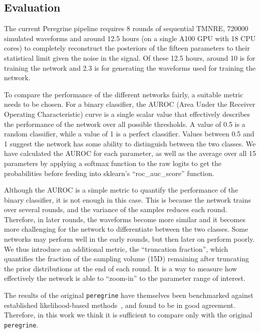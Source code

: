 \subsection{Evaluation}

The current Peregrine pipeline requires 8 rounds of sequential TMNRE, 720000 simulated waveforms and around 12.5 hours (on a single A100 GPU with 18 CPU cores) to completely reconstruct the posteriors of the fifteen parameters to their statistical limit given the noise in the signal. Of these 12.5 hours, around 10 is for training the network and 2.3 is for generating the waveforms used for training the network. 

To compare the performance of the different networks fairly, a suitable metric needs to be chosen. For a binary classifier, the AUROC (Area Under the Receiver Operating Characteristic) curve is a single scalar value that effectively describes the performance of the network over all possible thresholds. A value of 0.5 is a random classifier, while a value of 1 is a perfect classifier. Values between 0.5 and 1 suggest the network has some ability to distinguish between the two classes. We have calculated the AUROC for each parameter, as well as the average over all 15 parameters by applying a softmax function to the raw logits to get the probabilities before feeding into sklearn's \enquote{roc\_auc\_score} function.

Although the AUROC is a simple metric to quantify the performance of the binary classifier, it is not enough in this case. This is because the network trains over several rounds, and the variance of the samples reduces each round. Therefore, in later rounds,  the waveforms become more similar and it becomes more challenging for the network to differentiate between the two classes. Some networks may perform well in the early rounds, but then later on perform poorly. We thus introduce an additional metric, the \enquote{truncation fraction}, which quantifies the fraction of the sampling volume (15D) remaining after truncating the prior distributions at the end of each round. It is a way to measure how effectively the network is able to \enquote{zoom-in} to the parameter range of interest.

The results of the original \texttt{peregrine} have themselves been benchmarked against established likelihood-based methods~\cite{Speagle_2020}, and found to be in good agreement. Therefore, in this work we think it is sufficient to compare only with the original \texttt{peregrine}.


